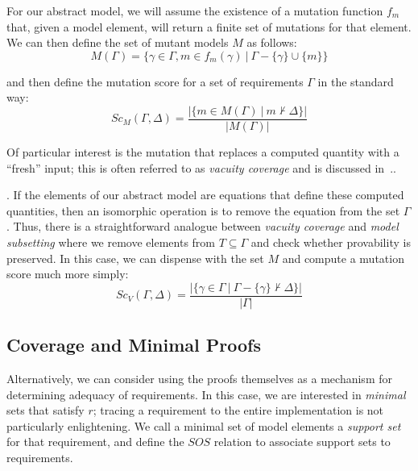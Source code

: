 
For our abstract model, we will assume the existence of a mutation function $f_{m}$ that, given a model element, will return a finite set of mutations for that element.  We can then define the set of mutant models $M$ as follows:
\[ 
    M(\Gamma) = \{ \gamma \in \Gamma, m \in f_{m}(\gamma)\ |\ \Gamma - \{\gamma\} \cup \{m\} \} 
\]

\noindent and then define the mutation score for a set of requirements $\Gamma$ in the standard way: 
\[
   Sc_{M}(\Gamma, \Delta) = \frac{ | \{m \in M(\Gamma)~|~ m \nvdash \Delta\} |}{|M(\Gamma)|}
\]



Of particular interest is the mutation that replaces a computed quantity with a ``fresh'' input; this is often referred to as {\em vacuity coverage} and is discussed in~\cite{chockler2010coverage,Kupferman:2006:SCF,kupferman_theory_2008}..  

.  If the elements of our abstract model are equations that define these computed quantities, then an isomorphic operation is to remove the equation from the set $\Gamma$.  Thus, there is a straightforward analogue between {\em vacuity coverage} and {\em model subsetting} where we remove elements from $T \subseteq \Gamma$ and check whether provability is preserved.  In this case, we can dispense with the set $M$ and compute a mutation score much more simply: 
\[
   Sc_{V}(\Gamma, \Delta) = \frac{ | \{\gamma \in \Gamma~|~ \Gamma - \{\gamma\} \nvdash \Delta\} |}{|\Gamma|}
\]






\subsection{Coverage and Minimal Proofs} 
Alternatively, we can consider using the proofs themselves as a mechanism for determining adequacy of requirements.  In this case, we are interested in {\em minimal} sets that satisfy $r$; tracing a requirement to the entire implementation is not particularly enlightening.  We call a minimal set of model elements a \emph{support set} for that requirement, and define the $SOS$ relation to associate support sets to requirements.

